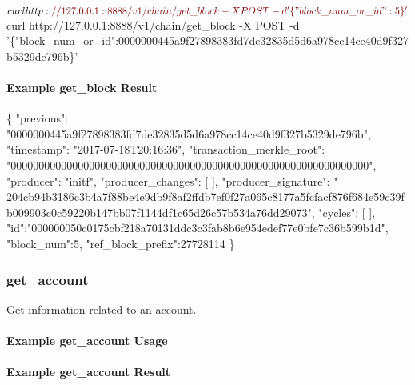 \begin{DoxyCode}
$ curl  http:\textcolor{comment}{//127.0.0.1:8888/v1/chain/get\_block -X POST -d '\{"block\_num\_or\_id":5\}'}
$ curl  http:\textcolor{comment}{//127.0.0.1:8888/v1/chain/get\_block -X POST -d
       '\{"block\_num\_or\_id":0000000445a9f27898383fd7de32835d5d6a978cc14ce40d9f327b5329de796b\}'}
\end{DoxyCode}
\hypertarget{group__aaciorpc_examplegetblockresult}{}\paragraph{Example get\+\_\+block Result}\label{group__aaciorpc_examplegetblockresult}

\begin{DoxyCode}
\{
  \textcolor{stringliteral}{"previous"}: \textcolor{stringliteral}{"0000000445a9f27898383fd7de32835d5d6a978cc14ce40d9f327b5329de796b"},
  \textcolor{stringliteral}{"timestamp"}: \textcolor{stringliteral}{"2017-07-18T20:16:36"},
  \textcolor{stringliteral}{"transaction\_merkle\_root"}: \textcolor{stringliteral}{"0000000000000000000000000000000000000000000000000000000000000000"},
  \textcolor{stringliteral}{"producer"}: \textcolor{stringliteral}{"initf"},
  \textcolor{stringliteral}{"producer\_changes"}: [ ],
  \textcolor{stringliteral}{"producer\_signature"}: \textcolor{stringliteral}{"
      204cb94b3186c3b4a7f88be4e9db9f8af2ffdb7ef0f27a065c8177a5fcfacf876f684e59c39fb009903c0c59220b147bb07f1144df1c65d26c57b534a76dd29073"},
  \textcolor{stringliteral}{"cycles"}: [ ],
  \textcolor{stringliteral}{"id"}:\textcolor{stringliteral}{"000000050c0175cbf218a70131ddc3c3fab8b6e954edef77e0bfe7c36b599b1d"},
  \textcolor{stringliteral}{"block\_num"}:5,
  \textcolor{stringliteral}{"ref\_block\_prefix"}:27728114
\}
\end{DoxyCode}
\hypertarget{group__aaciorpc_v1chaingetaccount}{}\subsubsection{get\+\_\+account}\label{group__aaciorpc_v1chaingetaccount}
Get information related to an account.\hypertarget{group__aaciorpc_examplegetaccount}{}\paragraph{Example get\+\_\+account Usage}\label{group__aaciorpc_examplegetaccount}

\hypertarget{group__aaciorpc_examplegetaccountresult}{}\paragraph{Example get\+\_\+account Result}\label{group__aaciorpc_examplegetaccountresult}

